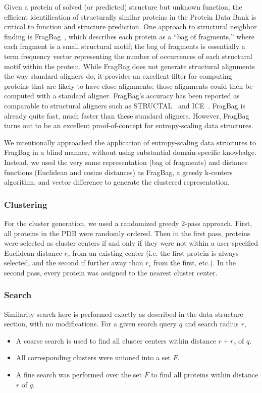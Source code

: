 \documentclass[review,preprint,12pt]{elsarticle}
\renewcommand{\cite}{\citep} %
\theoremstyle{definition}
\theoremstyle{remark}
\numberwithin{equation}{section}
\begin{document}
Given a protein of solved (or predicted) structure but unknown function, the efficient identification
of structurally similar proteins in the Protein Data Bank is critical to function and structure prediction.
One approach to structural neighbor finding is FragBag~\cite{budowski2010fragbag}, which describes each protein as a
``bag of fragments,'' where each fragment is a small structural motif; the bag of fragments is essentially
a term frequency vector representing the number of occurrences of each structural motif within the protein.
While FragBag does not generate structural alignments the way standard aligners do, it provides an excellent
filter for computing proteins that are likely to have close alignments; those alignments could then be computed
with a standard aligner.
FragBag's accuracy has been reported as comparable to structural aligners such as STRUCTAL~\cite{blah} and
ICE~\cite{blah}.
FragBag is already quite fast, much faster than these standard aligners.
However, FragBag turns out to be an excellent proof-of-concept for entropy-scaling data structures.

We intentionally approached the application of entropy-scaling data structures to FragBag in a blind manner,
without using substantial domain-specific knowledge.
Instead, we used the very same representation (bag of fragments) and distance functions (Euclidean and cosine distances)
as FragBag, a greedy k-centers algorithm, and vector difference to generate the clustered representation.

\subsubsection{Clustering}
For the cluster generation, we used a randomized greedy 2-pass approach.
First, all proteins in the PDB were randomly ordered.
Then in the first pass, proteins were selected as cluster centers if and only if they were not within a user-specified Euclidean distance $r_c$ from an existing center (i.e. the first protein is always selected, and the second if further away than $r_c$ from the first, etc.).
In the second pass, every protein was assigned to the nearest cluster center.

\subsubsection{Search}
Similarity search here is performed exactly as described in the data structure section, with no modifications.
For a given search query $q$ and search radius $r$,
\begin{itemize}
    \item A coarse search is used to find all cluster centers within distance $r+r_c$ of $q$.
    \item All corresponding clusters were unioned into a set $F$.
    \item A fine search was performed over the set $F$ to find all proteins within distance $r$ of $q$.
\end{itemize}
\end{document}
